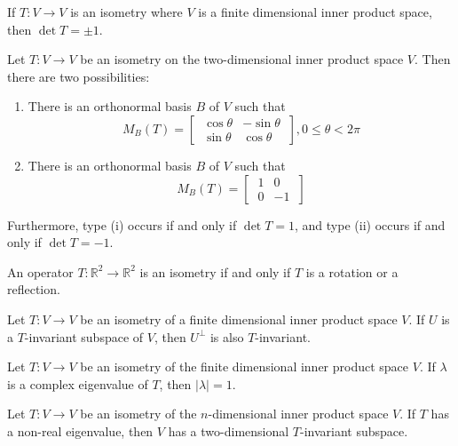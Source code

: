 \documentclass[12pt]{article}
\begin{document}
\begin{corollary}{}{}
    If $ T : V \to V $ is an isometry where $ V $ is a finite dimensional inner product space, then $ \det T = \pm 1 $.
\end{corollary}

\begin{theorem}{}{}
    Let $ T : V \to V $ be an isometry on the two-dimensional inner product space $ V $. Then there are two possibilities:
    \begin{enumerate}[label=(\roman*)]
        \item There is an orthonormal basis $ B $ of $ V $ such that
        \[ M_B \left( T \right) = \begin{bmatrix} \ \cos \theta & -\sin \theta \ \\ \ \sin \theta & \cos \theta \ \end{bmatrix}, 0 \leq \theta < 2 \pi \]
        \item There is an orthonormal basis $ B $ of $ V $ such that
        \[ M_B \left( T \right) = \begin{bmatrix} \ 1 & 0 \\ \ 0 & -1 \ \end{bmatrix} \]
    \end{enumerate}
    Furthermore, type (i) occurs if and only if $ \det T = 1 $, and type (ii) occurs if and only if $ \det T = -1 $.
\end{theorem}

\begin{corollary}{}{}
    An operator $ T : \mathbb{R}^2 \to \mathbb{R}^2 $ is an isometry if and only if $ T $ is a rotation or a reflection.
\end{corollary}

\begin{lemma}{}{}
    Let $ T : V \to V $ be an isometry of a finite dimensional inner product space $ V $. If $ U $ is a $ T $-invariant subspace of $ V $, then $ U^\perp $ is also $ T $-invariant.
\end{lemma}

\begin{lemma}{}{}
    Let $ T : V \to V $ be an isometry of the finite dimensional inner product space $ V $. If $ \lambda $ is a complex eigenvalue of $ T $, then $ \lvert \lambda \rvert = 1 $.
\end{lemma}

\begin{lemma}{}{}
    Let $ T : V \to V $ be an isometry of the $ n $-dimensional inner product space $ V $. If $ T $ has a non-real eigenvalue, then $ V $ has a two-dimensional $ T $-invariant subspace.
\end{lemma}
\end{document}
